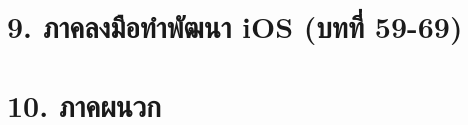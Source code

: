 \documentclass[11pt,a4paper,openany]{book}
\begin{document}
\part*{9. ภาคลงมือทำพัฒนา iOS (บทที่ 59-69)}











\appendix
\part*{10. ภาคผนวก}









\end{document}
